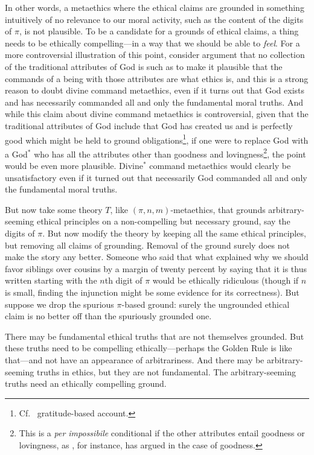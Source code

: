 In other words, a metaethics where the ethical claims are grounded in something intuitively of no relevance to our moral activity, such as the content of the
digits of $\pi$, is not plausible. To be a candidate for a grounds of ethical claims, a thing needs to be ethically compelling---in a way that we should be able to \textit{feel}. For a more controversial
illustration of this point, consider  argument that no collection of the traditional attributes of God is such 
as to make it plausible that the commands of a being with those attributes are what ethics is, and this is a strong reason to doubt divine
command metaethics, even if it turns out that God exists and has necessarily commanded all and only the fundamental moral
truths.  And while this claim about divine command metaethics is controversial, given that the traditional attributes of 
God include that God has created us and is perfectly good which might be held to ground obligations\footnote{Cf.\  
gratitude-based account.}, if one were to replace God with a God$^*$ who has all the attributes other than goodness and lovingness\footnote{This is a \textit{per impossibile} conditional if the other attributes entail goodness or lovingness, as , for instance, has argued in the case of goodness.}, the point would be even more plausible. Divine$^*$ command metaethics would clearly be unsatisfactory
even if it turned out that necessarily God commanded all and only the fundamental moral truths.

But now take some theory $T$, like $(\pi,n,m)$-metaethics, that  grounds arbitrary-seeming ethical principles on 
a non-compelling but necessary ground, say the digits of $\pi$. But now modify the theory by keeping all the same
ethical principles, but removing all claims of grounding.  Removal
of the ground surely does not make the story any better. Someone who said that what explained why we should favor siblings over cousins by a margin of
twenty percent by saying that it is thus written starting with the $n$th digit of $\pi$ would be ethically ridiculous (though if $n$ is small, finding
the injunction might be some evidence for its correctness). But suppose we drop the spurious $\pi$-based ground: surely the ungrounded ethical claim is no better off than the spuriously grounded one. 

There may be fundamental ethical truths that are not themselves grounded. But these truths need to be compelling ethically---perhaps the Golden Rule is like that---and not 
have an appearance of arbitrariness. And there may be arbitrary-seeming truths in ethics, but they are not 
fundamental. The arbitrary-seeming truths need an ethically compelling ground.

